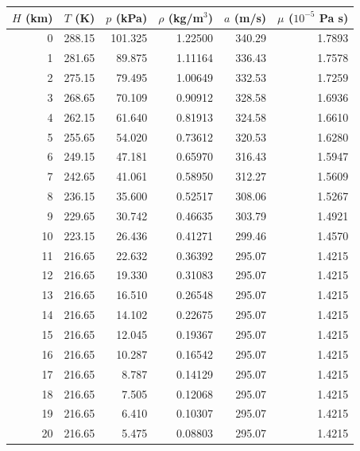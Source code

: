 \begin{longtable}{rrrrrr}
\toprule $H$ (km)&$T$ (K)&$p$ (kPa)&$\rho$ (kg/m$^3$)&$a$ (m/s)&$\mu$ ($10^{-5}$ Pa s)\\\midrule\endhead
0&288.15&101.325&1.22500&340.29&1.7893\\
1&281.65&89.875&1.11164&336.43&1.7578\\
2&275.15&79.495&1.00649&332.53&1.7259\\
3&268.65&70.109&0.90912&328.58&1.6936\\
4&262.15&61.640&0.81913&324.58&1.6610\\
5&255.65&54.020&0.73612&320.53&1.6280\\
6&249.15&47.181&0.65970&316.43&1.5947\\
7&242.65&41.061&0.58950&312.27&1.5609\\
8&236.15&35.600&0.52517&308.06&1.5267\\
9&229.65&30.742&0.46635&303.79&1.4921\\
10&223.15&26.436&0.41271&299.46&1.4570\\
11&216.65&22.632&0.36392&295.07&1.4215\\
12&216.65&19.330&0.31083&295.07&1.4215\\
13&216.65&16.510&0.26548&295.07&1.4215\\
14&216.65&14.102&0.22675&295.07&1.4215\\
15&216.65&12.045&0.19367&295.07&1.4215\\
16&216.65&10.287&0.16542&295.07&1.4215\\
17&216.65&8.787&0.14129&295.07&1.4215\\
18&216.65&7.505&0.12068&295.07&1.4215\\
19&216.65&6.410&0.10307&295.07&1.4215\\
20&216.65&5.475&0.08803&295.07&1.4215\\
\bottomrule\end{longtable}
